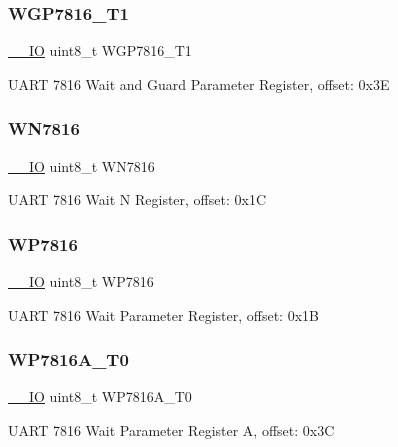 \subsubsection{\texorpdfstring{WGP7816\_T1}{WGP7816\_T1}}
{\footnotesize\ttfamily \mbox{\hyperlink{core__cm0plus_8h_aec43007d9998a0a0e01faede4133d6be}{\+\_\+\+\_\+\+IO}} uint8\+\_\+t W\+G\+P7816\+\_\+\+T1}

U\+A\+RT 7816 Wait and Guard Parameter Register, offset\+: 0x3E \mbox{\label{struct_u_a_r_t___type_ac7724a1254eff9850cc2c043fa2d0534}} 
\subsubsection{\texorpdfstring{WN7816}{WN7816}}
{\footnotesize\ttfamily \mbox{\hyperlink{core__cm0plus_8h_aec43007d9998a0a0e01faede4133d6be}{\+\_\+\+\_\+\+IO}} uint8\+\_\+t W\+N7816}

U\+A\+RT 7816 Wait N Register, offset\+: 0x1C \mbox{\label{struct_u_a_r_t___type_aa3f72d440c6487b4770a64743fe1ab15}} 
\subsubsection{\texorpdfstring{WP7816}{WP7816}}
{\footnotesize\ttfamily \mbox{\hyperlink{core__cm0plus_8h_aec43007d9998a0a0e01faede4133d6be}{\+\_\+\+\_\+\+IO}} uint8\+\_\+t W\+P7816}

U\+A\+RT 7816 Wait Parameter Register, offset\+: 0x1B \mbox{\label{struct_u_a_r_t___type_ac1a0e1a00eb516d6cbac701a5704124f}} 
\subsubsection{\texorpdfstring{WP7816A\_T0}{WP7816A\_T0}}
{\footnotesize\ttfamily \mbox{\hyperlink{core__cm0plus_8h_aec43007d9998a0a0e01faede4133d6be}{\+\_\+\+\_\+\+IO}} uint8\+\_\+t W\+P7816\+A\+\_\+\+T0}

U\+A\+RT 7816 Wait Parameter Register A, offset\+: 0x3C \mbox{\label{struct_u_a_r_t___type_ac856f6590921b79caebef629c5704c4e}} 
